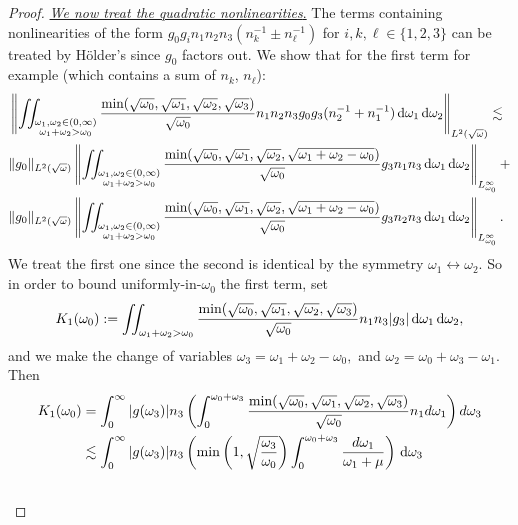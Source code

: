 \documentclass[reqno,11pt,letterpaper]{amsart}
\numberwithin{equation}{section}
\newcommand{\dd}{\, {\rm d}}
\begin{document}
\begin{proof}
\noindent
\underline{\emph{We now treat the quadratic nonlinearities}.} The terms containing nonlinearities of the form 
$g_0g_i n_1n_2 n_3 (n_k^{-1} \pm n_\ell^{-1})$ for $i, k, \ell \in \{1,2,3\}$ can be treated by H\"{o}lder's since $g_0$ factors out. We show that for the first term for example (which contains a sum of $n_k$, $n_\ell$): 
\begin{align*}
& \left\| 
\iint_{\substack{\omega_1, \omega_2 \in (0,\infty)\\ \omega_1+\omega_2>\omega_0}} 
\frac{\text{min}(\sqrt{\omega_0},\sqrt{\omega_1},\sqrt{\omega_2},\sqrt{\omega_3})}{\sqrt{\omega_0}} 
    n_1n_2n_3 g_0 g_3 ( n_2^{-1} + n_1^{-1} ) \dd\omega_1\dd\omega_2
\right\|_{L^2(\sqrt{\omega})} \lesssim \\
& 
\| g_0 \|_{L^2(\sqrt{\omega})} 
\left\| 
\iint_{\substack{\omega_1, \omega_2 \in (0,\infty)\\ \omega_1+\omega_2>\omega_0}}  \frac{\text{min}(\sqrt{\omega_0},\sqrt{\omega_1},\sqrt{\omega_2},\sqrt{\omega_1+\omega_2-\omega_0})}{\sqrt{\omega_0}} 
 g_3  n_1n_3  \dd\omega_1\dd\omega_2
\right\|_{L_{\omega_0}^\infty} + \\& 
 \| g_0 \|_{L^2(\sqrt{\omega})} 
 \left\| 
 \iint_{\substack{\omega_1, \omega_2 \in (0,\infty)\\ \omega_1+\omega_2>\omega_0}}   \frac{\text{min}(\sqrt{\omega_0},\sqrt{\omega_1},\sqrt{\omega_2},\sqrt{\omega_1+\omega_2-\omega_0})}{\sqrt{\omega_0}}  
   g_3  n_2 n_3  \dd\omega_1\dd\omega_2
\right\|_{L_{\omega_0}^\infty}.
\end{align*}
We treat the first one since the second is identical by the symmetry $\omega_1\leftrightarrow \omega_2$.
So in order to bound uniformly-in-$\omega_0$ the first term, set
$$
K_1(\omega_0)
:= \iint_{\omega_1+\omega_2>\omega_0}
\frac{\text{min}(\sqrt{\omega_0},\sqrt{\omega_1},\sqrt{\omega_2},\sqrt{\omega_3})}{\sqrt{\omega_0}} n_1n_3 |g_3| \dd\omega_1 \dd \omega_2,
$$ and we make the change of variables
$\omega_3=\omega_1+\omega_2-\omega_0,$ and $\omega_2=\omega_0+\omega_3-\omega_1.$ Then 
\begin{align*} 
K_1(\omega_0) 
&= \int_0^\infty |g(\omega_3)|n_3
\left(
\int_0^{\omega_0+\omega_3}
\frac{\text{min}(\sqrt{\omega_0},\sqrt{\omega_1},\sqrt{\omega_2},\sqrt{\omega_3})}{\sqrt{\omega_0}} n_1 d\omega_1
\right) d\omega_3
\\
& \lesssim 
\int_0^\infty |g(\omega_3)|n_3 \left( \min\left(1,\sqrt{\frac{\omega_3}{\omega_0}}\right)
\int_0^{\omega_0+\omega_3}\frac{d\omega_1}{\omega_1+\mu} \right) \dd\omega_3
\\ & 

\end{align*}
\end{proof}
\end{document}
